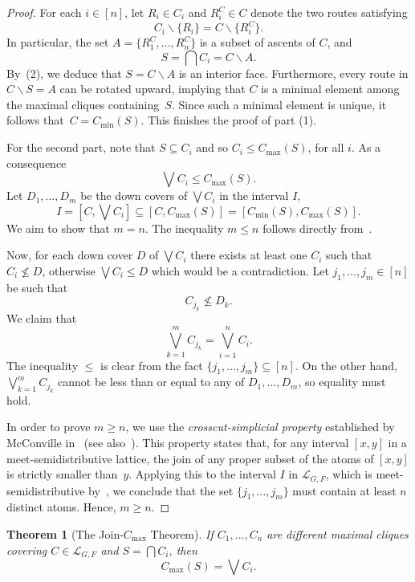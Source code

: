 \documentclass[12pt, reqno]{amsart}
\theoremstyle{plain}
\newtheorem{theorem}{Theorem}[section]
\theoremstyle{definition}
\numberwithin{equation}{section}
\newcommand\scrL{\mathscr{L}}
\begin{document}
\begin{proof}
    For each $i \in [n]$, let $R_i\in C_i$ and $R_i^C\in C$ denote the two routes satisfying
    \[
    C_i\smallsetminus\{R_i\}=C\smallsetminus \{R_i^C\}.
    \] 
    In particular, the set $A=\{R_1^C,\dots,R_n^C\}$ is a subset of ascents of $C$, and
    \[
    S=\bigcap C_i = C\smallsetminus A.
    \]
    By~(2), we deduce that $S=C\smallsetminus A$ is an interior face. Furthermore, every route in $C\smallsetminus S=A$ can be rotated upward, implying that $C$ is a minimal element among the maximal cliques containing~$S$. Since such a minimal element is unique, it follows that~$C=C_{\min}(S)$. This finishes the proof of part (1).

    For the second part, note that $S\subseteq C_i$ and so $C_i\leq C_{\max}(S)$, for all $i$. As a consequence
    \[
    \bigvee C_i\leq C_{\max}(S).
    \]
    Let $D_1,\dots,D_m$ be the down covers of $\bigvee C_i$ in the interval $I$,
    \[
    I=[C,\bigvee C_i]\subseteq [C,C_{\max}(S)]=[C_{\min}(S),C_{\max}(S)].
    \] 
    We aim to show that $m=n$. The inequality $m\leq n$ follows directly from~.

    Now, for each down cover $D$ of $\bigvee C_i$ there exists at least one $C_i$ such that $C_i \nleq D$, otherwise $\bigvee C_i\leq D$ which would be a contradiction. Let $j_1,\dots,j_m\in [n]$ be such that
    \[
    C_{j_k}\nleq D_k.
    \]
    We claim that
    \[
    \bigvee_{k=1}^m C_{j_k} = \bigvee_{i=1}^n C_i.
    \]
    The inequality $\leq$ is clear from the fact $\{j_1,\dots, j_m\}\subseteq [n]$. On the other hand, $\bigvee_{k=1}^m C_{j_k}$ cannot be less than or equal to any of $D_1,\dots, D_m$, so equality must hold.

    In order to prove $m\geq n$, we use the \emph{crosscut-simplicial property} established by McConville in~\cite[Theorem~6]{McConville_crosscut_2017} (see also~\cite[Theorem~2]{barnard_canonicaljoincomplex_2019}). This property states that, for any interval $[x,y]$ in a meet-semidistributive lattice, the join of any proper subset of the atoms of $[x,y]$ is strictly smaller than~$y$. Applying this to the interval $I$ in $\scrL_{G,F}$, which is meet-semidistributive by~\cite{vonBell_framing_2024}, we conclude that the set $\{j_1,\dots,j_m\}$ must contain at least $n$ distinct atoms. Hence, $m\geq n$.
\end{proof}

\begin{theorem}[The Join-$C_{\max}$ Theorem]\label{thm_join_max}
    If $C_1,\dots , C_n$ are different maximal cliques covering $C\in \scrL_{G,F}$ and $S=\bigcap C_i$, then
    \[
    C_{\max}(S) = \bigvee C_i.
    \]
\end{theorem}
\end{document}
